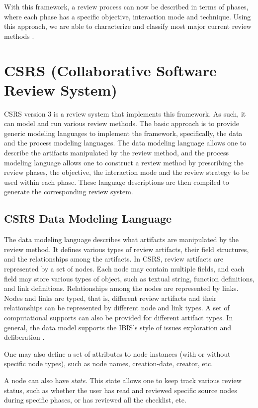 With this framework, a review process can now be described in terms
of phases, where each phase has a specific objective, interaction mode
and technique. Using this approach, we are able to characterize and
classify most major current review methods \cite{Tjahjono94}.

\section {CSRS (Collaborative Software Review System)}

CSRS version 3 is a review system that implements this framework. As
such, it can model and run various review methods. The basic approach
is to provide generic modeling languages to implement the framework,
specifically, the data and the process modeling languages.
The data modeling language allows one to describe the artifacts
manipulated by the review method, and the process modeling language
allows one to construct a review method by 
prescribing the review phases, the objective, the interaction mode and
the review strategy to be used within each phase.
These language descriptions are then compiled to generate the
corresponding review system. 


\subsection{CSRS Data Modeling Language}

The data modeling language describes what artifacts are manipulated by
the review method. It defines various types of review
artifacts, their field structures, and the relationships among the
artifacts. In CSRS, review artifacts are represented by a
set of nodes.
Each node may contain multiple fields, and each field may store
various types of object, such as 
textual string, function definitions, and link definitions.
Relationships among the nodes are represented by links.   
Nodes and links are typed, that is, different review artifacts and
their relationships can be represented by different node and link types. 
A set of computational supports can also be provided for different
artifact types.
In general, the data model supports the IBIS's style of issues exploration
and deliberation \cite{Conklin88}.  

One may also define a set of attributes to node instances (with or
without specific node types), such as node names, creation-date,
creator, etc. 

A node can also have {\it state}. This state allows one to
keep track various review status, such as whether the user has read
and reviewed specific source nodes during specific phases, or has
reviewed all the checklist, etc.

